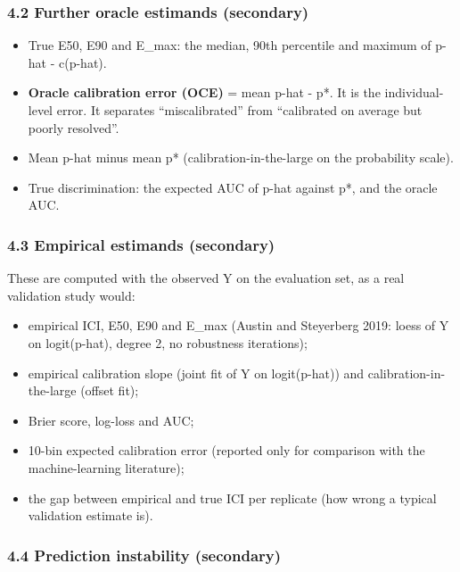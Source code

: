 \documentclass[
  10pt,
]{article}
\providecommand{\tightlist}{%
  \setlength{\itemsep}{0pt}\setlength{\parskip}{0pt}}
\begin{document}
\subsubsection{4.2 Further oracle estimands
(secondary)}\label{further-oracle-estimands-secondary}

\begin{itemize}
\tightlist
\item
  True E50, E90 and E\_max: the median, 90th percentile and
  maximum of \textbar p-hat - c(p-hat)\textbar.
\item
  \textbf{Oracle calibration error (OCE)} = mean
  \textbar p-hat - p*\textbar. It is the individual-level
  error. It separates ``miscalibrated'' from ``calibrated on
  average but poorly resolved''.
\item
  Mean p-hat minus mean p* (calibration-in-the-large on the
  probability scale).
\item
  True discrimination: the expected AUC of p-hat against p*,
  and the oracle AUC.
\end{itemize}

\subsubsection{4.3 Empirical estimands
(secondary)}\label{empirical-estimands-secondary}

These are computed with the observed Y on the evaluation
set, as a real validation study would:

\begin{itemize}
\tightlist
\item
  empirical ICI, E50, E90 and E\_max (Austin and Steyerberg
  2019: loess of Y on logit(p-hat), degree 2, no robustness
  iterations);
\item
  empirical calibration slope (joint fit of Y on
  logit(p-hat)) and calibration-in-the-large (offset fit);
\item
  Brier score, log-loss and AUC;
\item
  10-bin expected calibration error (reported only for
  comparison with the machine-learning literature);
\item
  the gap between empirical and true ICI per replicate (how
  wrong a typical validation estimate is).
\end{itemize}

\subsubsection{4.4 Prediction instability
(secondary)}\label{prediction-instability-secondary}
\end{document}
